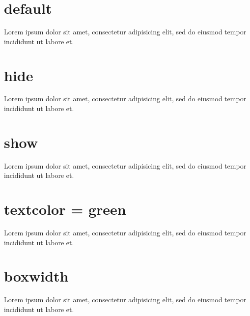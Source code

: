 \documentclass{article}
\begin{document}
\TestTitleDesc{}
{}

\section{default}

\begin{clozebox}
Lorem ipsum dolor sit amet, consectetur adipisicing elit, sed do eiusmod
tempor incididunt ut labore et.
\end{clozebox}

\section{hide}

\clozehide

\begin{clozebox}
Lorem ipsum dolor sit amet, consectetur adipisicing elit, sed do eiusmod
tempor incididunt ut labore et.
\end{clozebox}

\section{show}

\clozeshow

\begin{clozebox}
Lorem ipsum dolor sit amet, consectetur adipisicing elit, sed do eiusmod
tempor incididunt ut labore et.
\end{clozebox}

\section{textcolor = green}


\begin{clozebox}
Lorem ipsum dolor sit amet, consectetur adipisicing elit, sed do eiusmod
tempor incididunt ut labore et.
\end{clozebox}

\section{boxwidth}

\clozereset

\begin{clozebox}[boxwidth=5cm]
Lorem ipsum dolor sit amet, consectetur adipisicing elit, sed do eiusmod
tempor incididunt ut labore et.
\end{clozebox}
\end{document}
